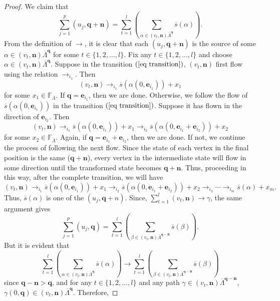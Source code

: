 \documentclass[a4paper,reqno,12pt]{amsart}
\numberwithin{equation}{section}
\theoremstyle{definition}
\theoremstyle{remark}
\newcommand{\N}{\mathbf{n}}
\begin{document}
\begin{proof}
We claim that \[\displaystyle{\sum_{j=1}^{p}} (u_j,\mathbf{q}+\N)=\displaystyle{\sum_{t=1}^{l}}\left(\displaystyle{\sum_{\alpha\in (v_t,\N)\overline{\Lambda}^\mathbf{q}}} \overline{s}(\alpha)\right).\] From the definition of $\longrightarrow$, it is clear that each $(u_j,\mathbf{q}+\N)$ is the source of some $\alpha\in (v_t,\N)\overline{\Lambda}^\mathbf{q}$ for some $t\in \{1,2,\ldots,l\}$. Fix any $t\in \{1,2,\ldots,l\}$ and choose $\alpha\in (v_t,\N)\overline{\Lambda}^\mathbf{q}$. Suppose in the transition $(\ref{eq transition})$, $(v_t,\N)$ first flow using the relation $\longrightarrow_{i_1}$. Then \[(v_t,\N)\longrightarrow_{i_1} \overline{s}(\alpha(0,\mathbf{e}_{i_1}))+x_1\] for some $x_1\in \mathbb{F}_{\overline{\Lambda}}$. If $\mathbf{q}=\mathbf{e}_{i_1}$, then we are done. Otherwise, we follow the flow of $\overline{s}(\alpha(0,\mathbf{e}_{i_1}))$ in the transition $(\ref{eq transition})$. Suppose it has flown in the direction of $\mathbf{e}_{i_2}$. Then \[(v_t,\N)\longrightarrow_{i_1} \overline{s}(\alpha(0,\mathbf{e}_{i_1}))+x_1\longrightarrow_{i_2} \overline{s}(\alpha(0,\mathbf{e}_{i_1}+\mathbf{e}_{i_2}))+x_2\] for some $x_2\in \mathbb{F}_{\overline{\Lambda}}$. Again, if $\mathbf{q}=\mathbf{e}_{i_1}+\mathbf{e}_{i_2}$, then we are done. If not, we continue the process of following the next flow. Since the state of each vertex in the final position is the same ($\mathbf{q}+\N$), every vertex in the intermediate state will flow in some direction until the transformed state becomes $\mathbf{q}+\N$. Thus, proceeding in this way, after the complete transition, we will have \[(v_t,\N)\longrightarrow_{i_1} \overline{s}(\alpha(0,\mathbf{e}_{i_1}))+x_1\longrightarrow_{i_2} \overline{s}(\alpha(0,\mathbf{e}_{i_1}+\mathbf{e}_{i_2}))+x_2\longrightarrow_{i_3}\cdots \longrightarrow_{i_m} \overline{s}(\alpha)+x_m.\] Thus, $\overline{s}(\alpha)$ is one of the $(u_j,\mathbf{q}+n)$. Since, $\displaystyle{\sum_{t=1}^{l}} (v_t,\N)\longrightarrow \gamma$, the same argument gives \[\displaystyle{\sum_{j=1}^{p}} (u_j,\mathbf{q})=\displaystyle{\sum_{t=1}^{l}}\left(\displaystyle{\sum_{\beta\in (v_t,\N)\overline{\Lambda}^{\mathbf{q}-\N}}} \overline{s}(\beta)\right).\] But it is evident that \[\displaystyle{\sum_{t=1}^{l}}\left(\displaystyle{\sum_{\alpha\in (v_t,\N)\overline{\Lambda}^\mathbf{q}}} \overline{s}(\alpha)\right)\longrightarrow \displaystyle{\sum_{t=1}^{l}}\left(\displaystyle{\sum_{\beta\in (v_t,\N)\overline{\Lambda}^{\mathbf{q}-\N}}} \overline{s}(\beta)\right)\] since $\mathbf{q}-\N> \mathbf{q}$, and for any $t\in \{1,2,\ldots,l\}$ and any path $\gamma\in (v_t,\N)\overline{\Lambda}^{\mathbf{q}-\N}$, $\gamma(0,\mathbf{q})\in (v_t,\N)\overline{\Lambda}^\mathbf{q}$. Therefore, 

\end{proof}
\end{document}

